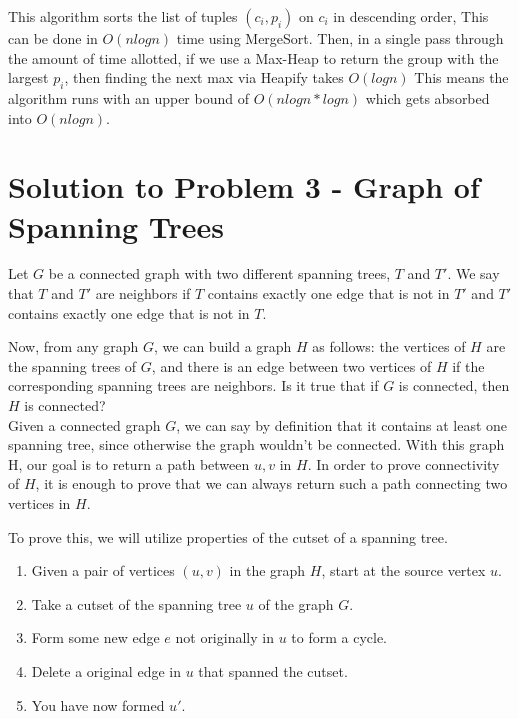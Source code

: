\documentclass[11pt]{article}
\begin{document}
This algorithm sorts the list of tuples $(c_i, p_i)$ on $c_i$ in descending order, This can be done in $O(nlogn)$ time using MergeSort. Then, in a single pass through the amount of time allotted, if we use a Max-Heap to return the group with the largest $p_i$, then finding the next max via Heapify takes $O(logn)$ This means the algorithm runs with an upper bound of $O(nlogn * logn)$ which gets absorbed into $O(nlogn)$.


\newpage


\section*{Solution to Problem 3 - Graph of Spanning Trees}

Let $G$ be a connected graph with two different spanning trees, $T$ and $T'$. We say that $T$ and $T'$ are neighbors if $T$ contains exactly one edge that is not in $T'$ and $T'$ contains exactly one edge that is not in $T$.

Now, from any graph $G$, we can build a graph $H$ as follows: the vertices of $H$ are the spanning trees of $G$, and there is an edge between two vertices of $H$ if the corresponding spanning trees are neighbors. Is it true that if $G$ is connected, then $H$ is connected?\\

Given a connected graph $G$, we can say by definition that it contains at least one spanning tree, since otherwise the graph wouldn't be connected. With this graph H, our goal is to return a path between $u, v$ in $H$. In order to prove connectivity of $H$, it is enough to prove that we can always return such a path connecting two vertices in $H$.

To prove this, we will utilize properties of the cutset of a spanning tree.

\begin{algo*}
\begin{enumerate}
\item Given a pair of vertices $(u,v)$ in the graph $H$, start at the source vertex $u$.
\item Take a cutset of the spanning tree $u$ of the graph $G$.
\item Form some new edge $e$ not originally in $u$ to form a cycle.
\item Delete a original edge in $u$ that spanned the cutset.
\item You have now formed $u'$.
\end{enumerate}
\end{algo*}
\end{document}
